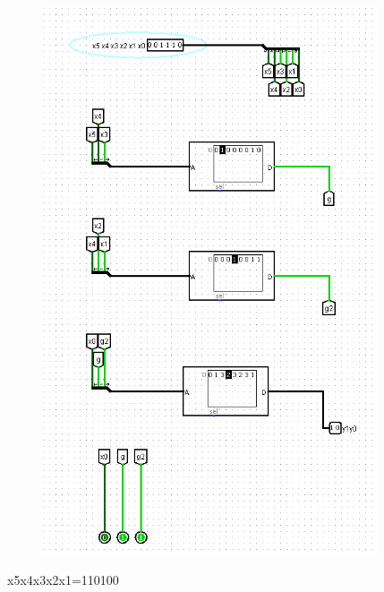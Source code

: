 \documentclass[]{article}
\begin{document}
\begin{figure}[H]
	\centering
	\includegraphics[width=0.88\textwidth]{test3_001110.png}
\end{figure}
\newpage
x5x4x3x2x1=110100
\end{document}
